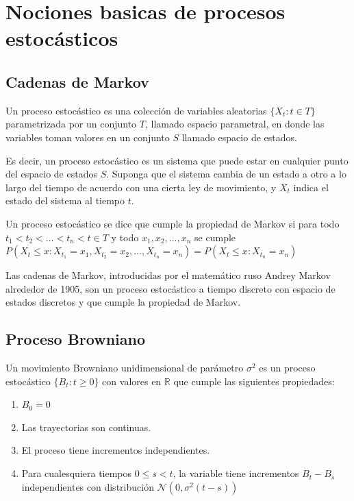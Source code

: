 


\begin{titlepage}

\end{titlepage}
\section{Nociones basicas de procesos estocásticos}
\subsection{Cadenas de Markov}
\begin{definition}
Un proceso estocástico es una colección de variables aleatorias $\{X_t : t\in T\}$ parametrizada por un conjunto $T$, llamado espacio parametral, en donde las variables toman valores en un conjunto $S$ llamado espacio de estados.
\end{definition}
Es decir, un proceso estocástico es un sistema que puede estar en cualquier punto del espacio de estados $S$. Suponga que el sistema cambia de un estado a otro a lo largo del tiempo de acuerdo con una cierta ley de movimiento, y $X_t$ indica el estado del sistema al tiempo $t$.
\begin{definition}
Un proceso estocástico se dice que cumple la propiedad de Markov si para todo $t_1<t_2<...<t_n<t \in T$ y todo $x_1,x_2,...,x_n$ se cumple $P(X_t\leq x : X_{t_1}=x_1, X_{t_2}=x_2, ..., X_{t_n}=x_n) = P(X_t\leq x : X_{t_n}=x_n)$
\end{definition}
Las cadenas de Markov, introducidas por el matemático ruso Andrey Markov alrededor de 1905, son un proceso estocástico a tiempo discreto con espacio de estados discretos y que cumple la propiedad de Markov.
\subsection{Proceso Browniano}
\begin{definition}
Un movimiento Browniano unidimensional de parámetro $\sigma^2$ es un proceso estocástico $\{B_t : t\geq 0\}$ con valores en $\mathbb{R}$ que cumple las siguientes propiedades:
\begin{enumerate}
    \item $B_0=0$
    \item Las trayectorias son continuas.
    \item El proceso tiene incrementos independientes.
    \item Para cualesquiera tiempos $0\leq s<t$, la variable tiene incrementos $B_t-B_s$ independientes con distribución $\mathcal{N}(0,\sigma^2(t-s))$
\end{enumerate}
\end{definition}



